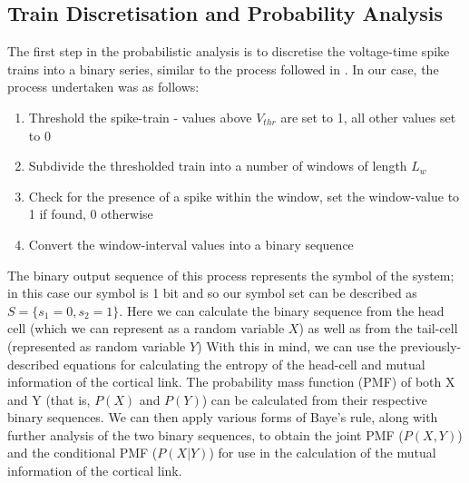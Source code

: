 \documentclass[letterpaper, 10 pt, conference]{ieeeconf}  %
\begin{document}
\subsection{Train Discretisation and Probability Analysis}
The first step in the probabilistic analysis is to discretise the voltage-time spike trains into a binary series, similar to the process followed in \cite{spikeTrainInfo}. In our case, the process undertaken was as follows:
\begin{enumerate}
    \item Threshold the spike-train - values above $V_{thr}$ are set to 1, all other values set to 0
    \item Subdivide the thresholded train into a number of windows of length $L_{w}$
    \item Check for the presence of a spike within the window, set the window-value to 1 if found, 0 otherwise
    \item Convert the window-interval values into a binary sequence
\end{enumerate}
The binary output sequence of this process represents the symbol of the system; in this case our symbol is 1 bit and so our symbol set can be described as $S=\{s_{1}=0, s_{2}=1\}$. Here we can calculate the binary sequence from the head cell (which we can represent as a random variable $X$) as well as from the tail-cell (represented as random variable $Y$) With this in mind, we can use the previously-described equations for calculating the entropy of the head-cell and mutual information of the cortical link. The probability mass function (PMF) of both X and Y (that is, $P(X)$ and $P(Y)$) can be calculated from their respective binary sequences. We can then apply various forms of Baye's rule, along with further analysis of the two binary sequences, to obtain the joint PMF ($P(X,Y)$) and the conditional PMF ($P(X|Y)$) for use in the calculation of the mutual information of the cortical link.
\end{document}
